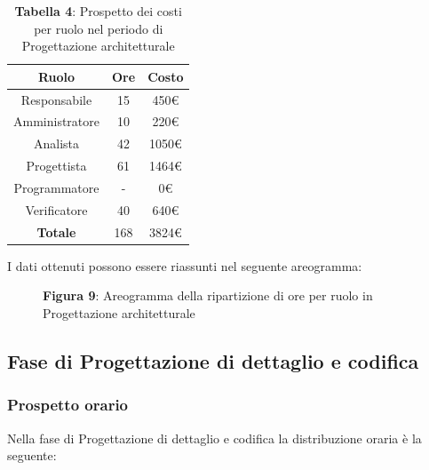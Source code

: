 \begin{table}[H]
	\centering
	\renewcommand{\arraystretch}{1.5}
	\begin{tabular}{|c|c|c|}
		\hline
		\rowcolor{lighter-grayer}
Ruolo & Ore & Costo \\ \hline
Responsabile & 15 & 450\euro \\ \hline
Amministratore & 10 & 220\euro \\ \hline
Analista & 42 & 1050\euro \\ \hline
Progettista & 61 & 1464\euro \\ \hline
Programmatore & - & 0\euro \\ \hline
Verificatore & 40 & 640\euro \\ \hline
\textbf{Totale} & 168 & 3824\euro \\ \hline
	\end{tabular}
	\caption*{\textbf{Tabella 4}: Prospetto dei costi per ruolo nel periodo di Progettazione architetturale\\}
\end{table}

I dati ottenuti possono essere riassunti nel seguente areogramma:


\begin{figure}[H]
	\centering
	\caption*{\textbf{Figura 9}: Areogramma della ripartizione di ore per ruolo in Progettazione architetturale}
	\label{fig:Figura10}
\end{figure}



\subsection{Fase di Progettazione di dettaglio e codifica}
\subsubsection{Prospetto orario}
Nella fase di Progettazione di dettaglio e codifica la distribuzione oraria è la seguente:

